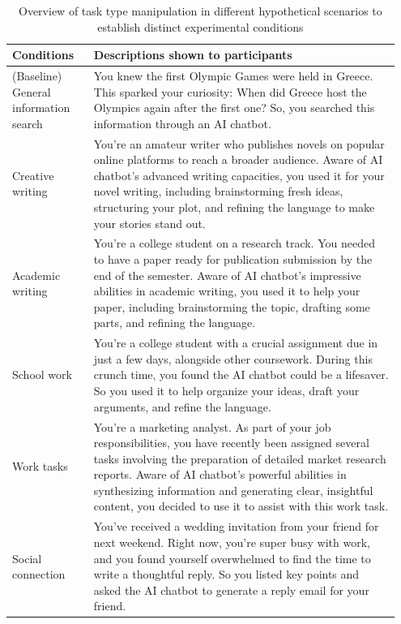 \begin{table}[]
    \centering
    \caption{Overview of task type manipulation in different hypothetical scenarios to establish distinct experimental conditions}
    \begin{tabular}{p{0.2\linewidth} p{0.75\linewidth}}
    \toprule
    Conditions& Descriptions shown to participants\\
    \midrule
    (Baseline) General information search& You knew the first Olympic Games were held in Greece. This sparked your curiosity: When did Greece host the Olympics again after the first one? So, you searched this information through an AI chatbot.\\
    Creative writing& You’re an amateur writer who publishes novels on popular online platforms to reach a broader audience. Aware of AI chatbot’s advanced writing capacities, you used it for your novel writing, including brainstorming fresh ideas, structuring your plot, and refining the language to make your stories stand out.\\
    Academic writing& You’re a college student on a research track. You needed to have a paper ready for publication submission by the end of the semester. Aware of AI chatbot’s impressive abilities in academic writing, you used it to help your paper, including brainstorming the topic, drafting some parts, and refining the language.\\
    School work& You’re a college student with a crucial assignment due in just a few days, alongside other coursework. During this crunch time, you found the AI chatbot could be a lifesaver. So you used it to help organize your ideas, draft your arguments, and refine the language.\\
    Work tasks& You’re a marketing analyst. As part of your job responsibilities, you have recently been assigned several tasks involving the preparation of detailed market research reports. Aware of AI chatbot's powerful abilities in synthesizing information and generating clear, insightful content, you decided to use it to assist with this work task.\\
    Social connection& You’ve received a wedding invitation from your friend for next weekend. Right now, you’re super busy with work, and you found yourself overwhelmed to find the time to write a thoughtful reply. So you listed key points and asked the AI chatbot to generate a reply email for your friend.\\
    \bottomrule
    \end{tabular}
    \label{tab:experimental-manipulations}
\end{table}